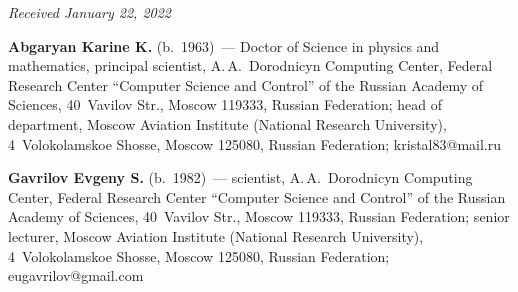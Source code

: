 \begin{multicols}{2}
{{ }
 }

\end{multicols}

\vspace*{-6pt}

\hfill{\small\textit{Received January 22, 2022}}


\Contr

\noindent
\textbf{Abgaryan Karine K.} (b.\ 1963)~--- Doctor of Science in physics and mathematics, principal 
scientist, A.\,A.~Dorodnicyn Computing Center, Federal Research Center ``Computer Science and 
Control'' of the Russian Academy of Sciences, 40~Vavilov Str., Moscow 119333, Russian Federation; 
head of department, Moscow Aviation Institute (National Research University), 4~Volokolamskoe 
Shosse, Moscow 125080, Russian Federation; \mbox{kristal83@mail.ru}

\vspace*{3pt}

\noindent
\textbf{Gavrilov Evgeny S.} (b.\ 1982)~--- scientist, A.\,A.~Dorodnicyn Computing Center, Federal 
Research Center ``Computer Science and Control'' of the Russian Academy of Sciences, 40~Vavilov 
Str., Moscow 119333, Russian Federation; senior lecturer, Moscow Aviation Institute (National 
Research University), 4~Volokolamskoe Shosse, Moscow 125080, Russian Federation; 
\mbox{eugavrilov@gmail.com}
       

\label{end\stat}

\renewcommand{\bibname}{\protect\rm Литература} 